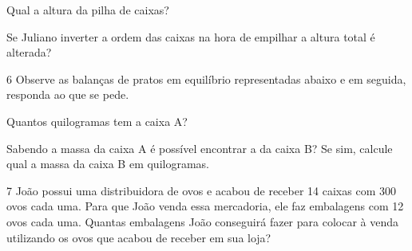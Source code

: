 
\begin{escolha}
\item
  Qual a altura da pilha de caixas?



\item
  Se Juliano inverter a ordem das caixas na hora de empilhar a altura
  total é alterada? \preencher {}
\end{escolha}


\num{6} Observe as balanças de pratos em equilíbrio representadas abaixo e
em seguida, responda ao que se pede.


\begin{escolha}
\item Quantos quilogramas tem a caixa A?



\item Sabendo a massa da caixa A é possível encontrar a da caixa B? Se sim,
  calcule qual a massa da caixa B em quilogramas.


\end{escolha}


\num{7} João possui uma distribuidora de ovos e acabou de receber 14 caixas
com 300 ovos cada uma. Para que João venda essa mercadoria, ele faz
embalagens com 12 ovos cada uma. Quantas embalagens João conseguirá
fazer para colocar à venda utilizando os ovos que acabou de receber em
sua loja?

